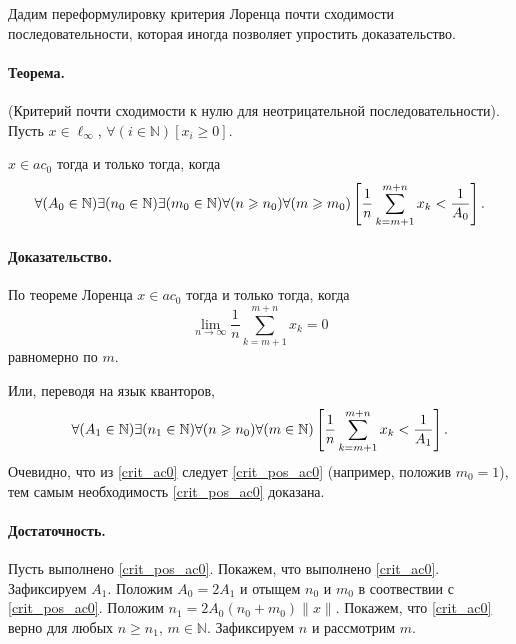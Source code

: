 Дадим переформулировку критерия Лоренца почти сходимости последовательности,
которая иногда позволяет упростить доказательство.


\paragraph{Теорема.}
(Критерий почти сходимости к нулю для неотрицательной последовательности).
Пусть $x\in\ell_{\infty}$,
$\forall(i\in\mathbb{N})[x_i\geq 0]$.

$x\in ac_0$ тогда и только тогда, когда
\begin{equation}\label{crit_pos_ac0}
	\forall(A_0\in\mathbb{N})
	\exists(n_0\in\mathbb{N})
	\exists(m_0\in\mathbb{N})
	\forall(n\geq n_0)
	\forall(m\geq m_0)
	\\
	\left[
		\frac{1}{n}
		\sum_{k=m+1}^{m+n} x_k
		<
		\frac{1}{A_0}
	\right]
	.
\end{equation}

\paragraph{Доказательство.}
По теореме Лоренца $x\in ac_0$ тогда и только тогда, когда
\begin{equation}\label{Lorencz_ac0}
	\lim_{n\to\infty} \frac{1}{n} \sum_{k=m+1}^{m+n} x_k = 0
\end{equation}
равномерно по $m$.

Или, переводя на язык кванторов,
\begin{equation}\label{crit_ac0}
	\forall(A_1\in\mathbb{N})
	\exists(n_1\in\mathbb{N})
	\forall(n\geq n_0)
	\forall(m \in \mathbb{N})
	\\
	\left[
		\frac{1}{n}
		\sum_{k=m+1}^{m+n} x_k
		<
		\frac{1}{A_1}
	\right]
	.
\end{equation}
Очевидно, что из \eqref{crit_ac0} следует \eqref{crit_pos_ac0} (например, положив $m_0 = 1$),
тем самым необходимость \eqref{crit_pos_ac0} доказана.

\paragraph{Достаточность.}
Пусть выполнено \eqref{crit_pos_ac0}.
Покажем, что выполнено \eqref{crit_ac0}.
Зафиксируем $A_1$.
Положим $A_0 = 2A_1$ и отыщем $n_0$ и $m_0$ в соотвествии с \eqref{crit_pos_ac0}.
Положим $n_1 = 2A_0(n_0+m_0)\|x\|$.
Покажем, что \eqref{crit_ac0} верно для любых $n\geq n_1$, $m\in \mathbb{N}$.
Зафиксируем $n$ и рассмотрим $m$.

